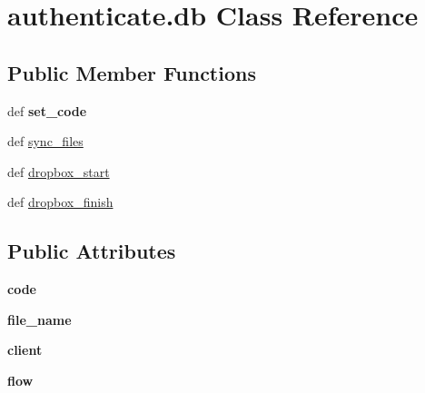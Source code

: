 \hypertarget{classauthenticate_1_1db}{\section{authenticate.\-db Class Reference}
\label{classauthenticate_1_1db}
}
\subsection*{Public Member Functions}
\begin{DoxyCompactItemize}
\item 
\hypertarget{classauthenticate_1_1db_aaf50cde8ecce54c63ee76cd9cc097b55}{def {\bfseries set\-\_\-code}}\label{classauthenticate_1_1db_aaf50cde8ecce54c63ee76cd9cc097b55}

\item 
def \hyperlink{classauthenticate_1_1db_a1a29fbc0d4886ec731bf66c61834469f}{sync\-\_\-files}
\item 
def \hyperlink{classauthenticate_1_1db_ad8e9b741251f7f568192ce88beab8b36}{dropbox\-\_\-start}
\item 
def \hyperlink{classauthenticate_1_1db_a9e79b1a35bad0774f6aac222d6bde47f}{dropbox\-\_\-finish}
\end{DoxyCompactItemize}
\subsection*{Public Attributes}
\begin{DoxyCompactItemize}
\item 
\hypertarget{classauthenticate_1_1db_a55b1202e92698417cae468126486c7b9}{{\bfseries code}}\label{classauthenticate_1_1db_a55b1202e92698417cae468126486c7b9}

\item 
\hypertarget{classauthenticate_1_1db_ab20d3de032a4521b086e8392debd2e48}{{\bfseries file\-\_\-name}}\label{classauthenticate_1_1db_ab20d3de032a4521b086e8392debd2e48}

\item 
\hypertarget{classauthenticate_1_1db_ad894cdae535ccef5e7146712d7d403d9}{{\bfseries client}}\label{classauthenticate_1_1db_ad894cdae535ccef5e7146712d7d403d9}

\item 
\hypertarget{classauthenticate_1_1db_ac37e2cb2beeab1a4a33d0ad58b7f8f3d}{{\bfseries flow}}\label{classauthenticate_1_1db_ac37e2cb2beeab1a4a33d0ad58b7f8f3d}

\end{DoxyCompactItemize}


